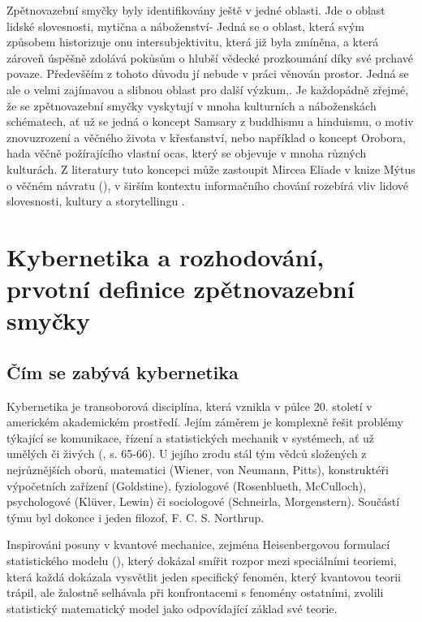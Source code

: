 \documentclass[11pt,a4paper]{article}
\begin{document}
Zpětnovazební smyčky byly identifikovány ještě v jedné oblasti. Jde o oblast lidské slovesnosti, mytična a náboženství-  Jedná se o oblast, která svým způsobem historizuje onu intersubjektivitu, která již byla zmíněna, a která zároveň úspěšně zdolává pokůsům o hlubší vědecké prozkoumání díky své prchavé povaze. Předevšěím z tohoto důvodu jí nebude v práci věnován prostor. Jedná se ale o velmi zajímavou a slibnou oblast pro další výzkum,. Je každopádně zřejmé, že se zpětnovazební smyčky vyskytují v mnoha kulturních a náboženskách schématech, ať už se jedná o koncept Samsary z buddhismu a hinduismu, o motiv znovuzrození a věčného života v křesťanství, nebo například o koncept Orobora, hada věčně požírajícího vlastní ocas, který se objevuje v mnoha různých kulturách. Z literatury tuto koncepci může zastoupit Mircea Eliade v knize Mýtus o věčném návratu (\cite{eliade_mytus_2003}), v širším kontextu informačního chování rozebírá vliv lidové slovesnosti, kultury a storytellingu \cite{mcdowell_storytelling_2021}.

\pagebreak

\section{Kybernetika a rozhodování, prvotní definice zpětnovazební smyčky}

\subsection{Čím se zabývá kybernetika}
Kybernetika je transoborová disciplína, která vznikla v půlce 20. století v americkém akademickém prostředí. Jejím záměrem je komplexně řešit problémy týkající se komunikace, řízení a statistických mechanik v systémech, ať už umělých či živých (\cite{wiener_cybernetics_2019}, s. 65-66). U jejího zrodu stál tým vědců složených z nejrůznějších oborů, matematici (Wiener, von Neumann, Pitts), konstruktéři výpočetních zařízení (Goldstine), fyziologové (Rosenblueth, McCulloch), psychologové (Klüver, Lewin)  či sociologové (Schneirla, Morgenstern).  Součástí týmu byl dokonce i jeden filozof, F. C. S. Northrup. 

Inspirováni posuny v kvantové mechanice, zejména Heisenbergovou formulací statistického modelu (\cite{heisenberg_uber_1925, waerden_sources_1968}), který dokázal smířit rozpor mezi speciálními teoriemi, která každá dokázala vysvětlit jeden specifický fenomén, který kvantovou teorii trápil, ale žalostně selhávala při konfrontacemi s fenomény ostatními, zvolili statistický matematický model jako odpovídající základ své teorie. 
\end{document}
